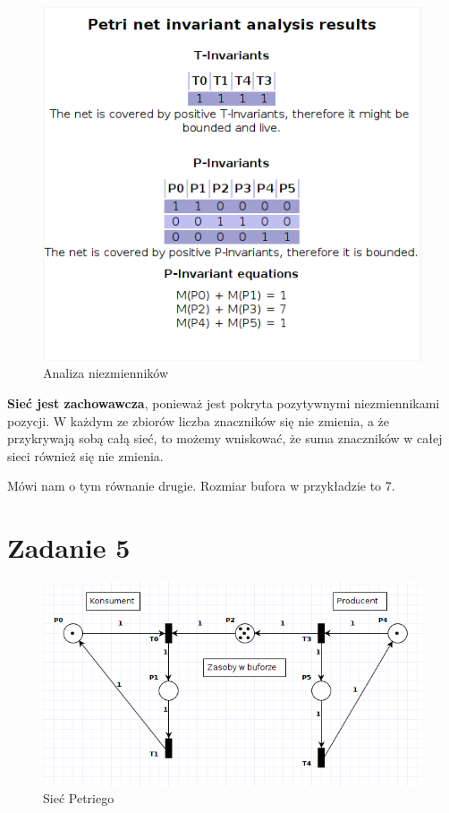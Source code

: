 \documentclass[12pt,a4paper,table]{article}
\begin{document}
    \begin{figure}[H]
        \centering
        \includegraphics[width=0.6\linewidth]{img/zad4-2.png}
        \caption{Analiza niezmienników}
        \label{fig:zad4-2}
    \end{figure}

    \textbf{Sieć jest zachowawcza}, ponieważ jest pokryta pozytywnymi niezmiennikami 
    pozycji. W każdym ze zbiorów liczba znaczników się nie zmienia, a że przykrywają sobą całą sieć,
    to możemy wniskować, że suma znaczników w całej sieci również się nie zmienia.

    Mówi nam o tym równanie drugie. Rozmiar bufora w przykładzie to 7.

    \section{Zadanie 5}

    \begin{figure}[H]
        \centering
        \includegraphics[width=0.8\linewidth]{img/zad5-1.png}
        \caption{Sieć Petriego}
        \label{fig:zad5-1}
    \end{figure}
\end{document}
